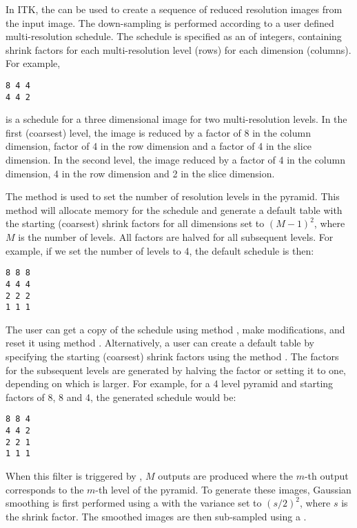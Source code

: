 

In ITK, the  can be used to create
a sequence of reduced resolution images from the input image.  The
down-sampling is performed according to a user defined multi-resolution
schedule. The schedule is specified as an  of integers,
containing shrink factors for each multi-resolution level (rows) for each
dimension (columns). For example,

\small
\begin{verbatim}
8 4 4
4 4 2
\end{verbatim}
\normalsize

is a schedule for a three dimensional image for two multi-resolution levels. 
In the first (coarsest) level, the image is reduced by a factor of 8 
in the column dimension, factor of 4 in the row dimension and a factor
of 4 in the slice dimension. In the second level, the image reduced
by a factor of 4 in the column dimension, 4 in the row dimension and
2 in the slice dimension.


The method  is used to set the number of
resolution levels in the pyramid. This method will allocate memory
for the schedule and generate a default table with the starting
(coarsest) shrink factors for all dimensions set to $(M-1)^2$, 
where $M$ is the number of levels. All factors are halved for
all subsequent levels. For example, if we set the number of levels
to 4, the default schedule is then:

\small
\begin{verbatim}
8 8 8
4 4 4
2 2 2
1 1 1
\end{verbatim}
\normalsize


The user can get a copy of the schedule using method ,
make modifications, and reset it using method .
Alternatively, a user can create a default table by specifying the
starting (coarsest) shrink factors using the method 
. The factors for the subsequent
levels are generated by halving the factor or setting it to one, 
depending on which is larger. For example, for a 4 level pyramid
and starting factors of 8, 8 and 4, the generated schedule would be:

\small
\begin{verbatim}
8 8 4
4 4 2
2 2 1
1 1 1
\end{verbatim}
\normalsize

When this filter is triggered by , $M$ outputs are produced
where the $m$-th output corresponds to the $m$-th level of the pyramid.
To generate these images, Gaussian smoothing is first performed using a
 with the variance set to $(s/2)^2$,
where $s$ is the shrink factor. The smoothed images are then sub-sampled using
a .
